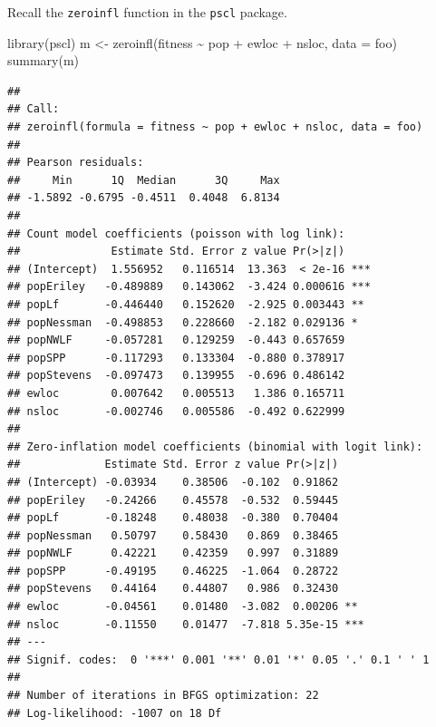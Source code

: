 \documentclass[
  ignorenonframetext,
]{beamer}
\newenvironment{Shaded}{\begin{snugshade}}{\end{snugshade}}
\newcommand{\AttributeTok}[1]{\textcolor[rgb]{0.77,0.63,0.00}{#1}}
\newcommand{\FunctionTok}[1]{\textcolor[rgb]{0.00,0.00,0.00}{#1}}
\newcommand{\NormalTok}[1]{#1}
\newcommand{\OtherTok}[1]{\textcolor[rgb]{0.56,0.35,0.01}{#1}}
\newcommand{\SpecialCharTok}[1]{\textcolor[rgb]{0.00,0.00,0.00}{#1}}
\begin{document}
\begin{frame}[fragile]{}
\protect\hypertarget{section-42}{}
Recall the \texttt{zeroinfl} function in the \texttt{pscl} package.

\vspace{12pt}
\tiny

\begin{Shaded}
\begin{Highlighting}[]
\FunctionTok{library}\NormalTok{(pscl)}
\NormalTok{m }\OtherTok{\textless{}{-}} \FunctionTok{zeroinfl}\NormalTok{(fitness }\SpecialCharTok{\textasciitilde{}}\NormalTok{ pop }\SpecialCharTok{+}\NormalTok{ ewloc }\SpecialCharTok{+}\NormalTok{ nsloc, }\AttributeTok{data =}\NormalTok{ foo)}
\FunctionTok{summary}\NormalTok{(m)}
\end{Highlighting}
\end{Shaded}

\begin{verbatim}
## 
## Call:
## zeroinfl(formula = fitness ~ pop + ewloc + nsloc, data = foo)
## 
## Pearson residuals:
##     Min      1Q  Median      3Q     Max 
## -1.5892 -0.6795 -0.4511  0.4048  6.8134 
## 
## Count model coefficients (poisson with log link):
##              Estimate Std. Error z value Pr(>|z|)    
## (Intercept)  1.556952   0.116514  13.363  < 2e-16 ***
## popEriley   -0.489889   0.143062  -3.424 0.000616 ***
## popLf       -0.446440   0.152620  -2.925 0.003443 ** 
## popNessman  -0.498853   0.228660  -2.182 0.029136 *  
## popNWLF     -0.057281   0.129259  -0.443 0.657659    
## popSPP      -0.117293   0.133304  -0.880 0.378917    
## popStevens  -0.097473   0.139955  -0.696 0.486142    
## ewloc        0.007642   0.005513   1.386 0.165711    
## nsloc       -0.002746   0.005586  -0.492 0.622999    
## 
## Zero-inflation model coefficients (binomial with logit link):
##             Estimate Std. Error z value Pr(>|z|)    
## (Intercept) -0.03934    0.38506  -0.102  0.91862    
## popEriley   -0.24266    0.45578  -0.532  0.59445    
## popLf       -0.18248    0.48038  -0.380  0.70404    
## popNessman   0.50797    0.58430   0.869  0.38465    
## popNWLF      0.42221    0.42359   0.997  0.31889    
## popSPP      -0.49195    0.46225  -1.064  0.28722    
## popStevens   0.44164    0.44807   0.986  0.32430    
## ewloc       -0.04561    0.01480  -3.082  0.00206 ** 
## nsloc       -0.11550    0.01477  -7.818 5.35e-15 ***
## ---
## Signif. codes:  0 '***' 0.001 '**' 0.01 '*' 0.05 '.' 0.1 ' ' 1 
## 
## Number of iterations in BFGS optimization: 22 
## Log-likelihood: -1007 on 18 Df
\end{verbatim}
\end{frame}
\end{document}
